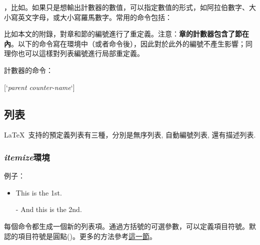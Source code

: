 ，比如。如果只是想輸出計數器的數值，可以指定數值的形式，如阿拉伯數字、大小寫英文字母，或大小寫羅馬數字。常用的命令包括：
\begin{latex}
\Alph \alph \Roman \roman
\end{latex}

比如本文的附錄，對章和節的編號進行了重定義。注意：\textbf{章的計數器包含了節在內}。以下的命令寫在環境中（或者命令後），因此對於此外的編號不產生影響；同理你也可以這樣對列表編號進行局部重定義。
\begin{latex}
\renewcommand{\thechapter}{\Alph{chapter}}
\renewcommand{\thesection}
    {\thechapter-\arabic{section}}
\renewcommand{\thefootnote}{[\arabic{footnote}]}
\end{latex}

計數器的命令：
\begin{latex}
[`\textit{parent counter-name}`]
\end{latex}

\subsection{列表}
\LaTeX\ 支持的預定義列表有三種，分別是無序列表, 自動編號列表, 還有描述列表.

\subsubsection{\textit{itemize}環境}
例子：

\begin{codeshow}
\begin{itemize}
  \item This is the 1st.
  \item[-] And this is the 2nd.
\end{itemize}
\end{codeshow}

每個命令都生成一個新的列表項。通過方括號的可選參數，可以定義項目符號。默認的項目符號是圓點()。更多的方法參考\hyperref[sec:list]{這一節}。


